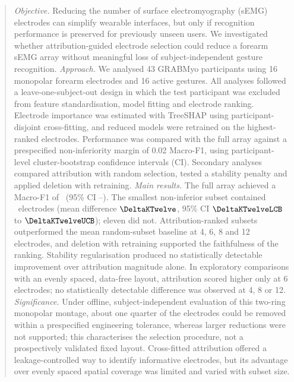 \documentclass{iopjournal}
\newif\ifshowchanges
\newcommand{\chg}[1]{\ifshowchanges{\color{blue}#1}\else{#1}\fi}
\begin{document}
\begin{abstract}
\justifying
\textit{Objective.} Reducing the number of surface electromyography (sEMG) electrodes can simplify wearable interfaces, but only if recognition performance is preserved for previously unseen users. We investigated whether attribution-guided electrode selection could reduce a forearm sEMG array without meaningful loss of subject-independent gesture recognition.
\textit{Approach.} We analysed 43 GRABMyo participants using 16 monopolar forearm electrodes and 16 active gestures. All analyses followed a leave-one-subject-out design in which the test participant was excluded from feature standardisation, model fitting and electrode ranking. Electrode importance was estimated with TreeSHAP \chg{using} participant-disjoint cross-fitting, and reduced models were retrained on the highest-ranked electrodes. Performance was compared with the full array against a prespecified non-inferiority margin of 0.02 Macro-F1, using participant-level cluster-bootstrap confidence intervals (CI). \chg{Secondary analyses compared attribution with random selection, tested a stability penalty and applied deletion with retraining.}
\textit{Main results.} The full array achieved a Macro-F1 of \FullXGB\ (95\% CI \FullXGBLCB--\FullXGBUCB). The smallest non-inferior subset contained \KStar\ electrodes (mean difference $\DeltaKTwelve$, 95\% CI $\DeltaKTwelveLCB$ to $\DeltaKTwelveUCB$); \chg{eleven did not.} Attribution-ranked subsets outperformed the mean random-subset baseline at 4, 6, 8 and 12 electrodes, and deletion with retraining supported the faithfulness of the ranking. Stability regularisation produced no statistically detectable improvement over attribution magnitude alone. \chg{In exploratory comparisons with an evenly spaced, data-free layout, attribution scored higher only at 6 electrodes; no statistically detectable difference was observed at 4, 8 or 12.}
\textit{Significance.} Under offline, subject-independent evaluation of this two-ring monopolar montage, about one quarter of the electrodes could be removed within a prespecified engineering tolerance, whereas larger reductions \chg{were not supported}; this characterises the selection procedure, not a prospectively validated fixed layout. Cross-fitted attribution offered a leakage-controlled way to identify informative electrodes, but its advantage over \chg{evenly spaced} spatial coverage was limited and varied with subset size.
\end{abstract}






\end{document}
